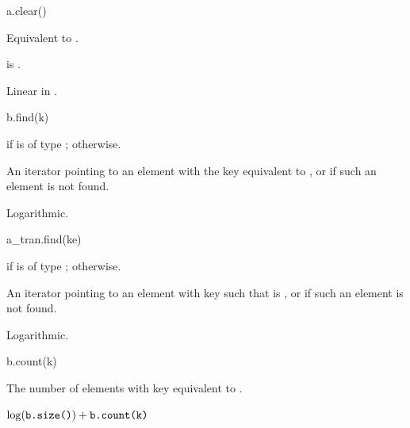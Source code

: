 %
\begin{itemdecl}
a.clear()
\end{itemdecl}

\begin{itemdescr}
\pnum
\effects
Equivalent to .

\pnum
\ensures
{} is .

\pnum
\complexity
Linear in .
\end{itemdescr}

%
\begin{itemdecl}
b.find(k)
\end{itemdecl}

\begin{itemdescr}
\pnum
\result
{} if  is of type ;
 otherwise.

\pnum
\returns
An iterator pointing to an element with the key equivalent to , or
 if such an element is not found.

\pnum
\complexity
Logarithmic.
\end{itemdescr}

%
\begin{itemdecl}
a_tran.find(ke)
\end{itemdecl}

\begin{itemdescr}
\pnum
\result
{} if  is of type ;
 otherwise.

\pnum
\returns
An iterator pointing to an element with key 
such that  is , or
 if such an element is not found.

\pnum
\complexity
Logarithmic.
\end{itemdescr}

%
\begin{itemdecl}
b.count(k)
\end{itemdecl}

\begin{itemdescr}
\pnum
\result
{}

\pnum
\returns
The number of elements with key equivalent to .

\pnum
\complexity
$\log (\tcode{b.size()}) + \tcode{b.count(k)}$
\end{itemdescr}

